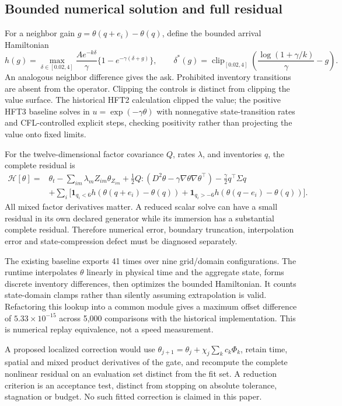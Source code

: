 \subsection{Bounded numerical solution and full residual}
For a neighbor gain $g=\theta(q+e_i)-\theta(q)$, define the bounded arrival Hamiltonian
\[
 h(g)=\max_{\delta\in[0.02,4]}\frac{Ae^{-k\delta}}{\gamma}\{1-e^{-\gamma(\delta+g)}\},\qquad
 \delta^*(g)=\operatorname{clip}_{[0.02,4]}\!\left(\frac{\log(1+\gamma/k)}{\gamma}-g\right).
\]
An analogous neighbor difference gives the ask. Prohibited inventory transitions are absent from the operator. Clipping the controls is distinct from clipping the value surface. The historical HFT2 calculation clipped the value; the positive HFT3 baseline solves in $u=\exp(-\gamma\theta)$ with nonnegative state-transition rates and CFL-controlled explicit steps, checking positivity rather than projecting the value onto fixed limits.

For the twelve-dimensional factor covariance $Q$, rates $\lambda$, and inventories $q$, the complete residual is
\begin{align}
\mathcal H[\theta]={}&\theta_t-\sum_{im}\lambda_mZ_{im}\theta_{Z_{im}}+
 \tfrac12 Q:(D^2\theta-\gamma\nabla\theta\nabla\theta^\top)
 -\tfrac\gamma2 q^\top\Sigma q\\
 &+\sum_i\big[\mathbf1_{q_i<6}h(\theta(q+e_i)-\theta(q))+
 \mathbf1_{q_i>-6}h(\theta(q-e_i)-\theta(q))\big].
\end{align}
All mixed factor derivatives matter. A reduced scalar solve can have a small residual in its own declared generator while its immersion has a substantial complete residual. Therefore numerical error, boundary truncation, interpolation error and state-compression defect must be diagnosed separately.

The existing baseline exports 41 times over nine grid/domain configurations. The runtime interpolates $\theta$ linearly in physical time and the aggregate state, forms discrete inventory differences, then optimizes the bounded Hamiltonian. It counts state-domain clamps rather than silently assuming extrapolation is valid. Refactoring this lookup into a common module gives a maximum offset difference of $5.33\times10^{-15}$ across 5,000 comparisons with the historical implementation. This is numerical replay equivalence, not a speed measurement.

A proposed localized correction would use $\theta_{j+1}=\theta_j+\chi_j\sum_kc_k\Phi_k$, retain time, spatial and mixed product derivatives of the gate, and recompute the complete nonlinear residual on an evaluation set distinct from the fit set. A reduction criterion is an acceptance test, distinct from stopping on absolute tolerance, stagnation or budget. No such fitted correction is claimed in this paper.


